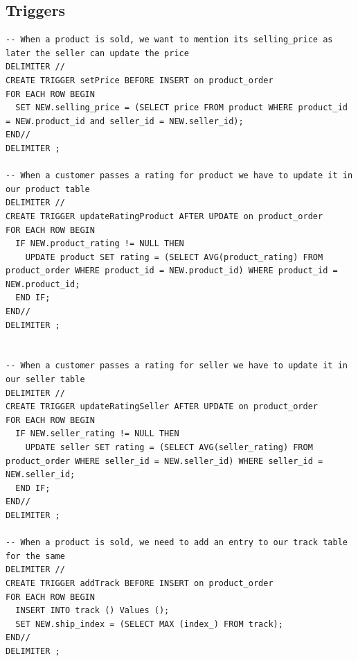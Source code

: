 \documentclass[a4paper,12pt]{article}
\begin{document}
\subsection{Triggers}
\begin{verbatim}
-- When a product is sold, we want to mention its selling_price as later the seller can update the price
DELIMITER //
CREATE TRIGGER setPrice BEFORE INSERT on product_order
FOR EACH ROW BEGIN
  SET NEW.selling_price = (SELECT price FROM product WHERE product_id = NEW.product_id and seller_id = NEW.seller_id);
END//
DELIMITER ;

-- When a customer passes a rating for product we have to update it in our product table
DELIMITER //
CREATE TRIGGER updateRatingProduct AFTER UPDATE on product_order
FOR EACH ROW BEGIN
  IF NEW.product_rating != NULL THEN
    UPDATE product SET rating = (SELECT AVG(product_rating) FROM product_order WHERE product_id = NEW.product_id) WHERE product_id = NEW.product_id;
  END IF;
END//
DELIMITER ;


-- When a customer passes a rating for seller we have to update it in our seller table
DELIMITER //
CREATE TRIGGER updateRatingSeller AFTER UPDATE on product_order
FOR EACH ROW BEGIN
  IF NEW.seller_rating != NULL THEN
    UPDATE seller SET rating = (SELECT AVG(seller_rating) FROM product_order WHERE seller_id = NEW.seller_id) WHERE seller_id = NEW.seller_id;
  END IF;
END//
DELIMITER ;

-- When a product is sold, we need to add an entry to our track table for the same
DELIMITER //
CREATE TRIGGER addTrack BEFORE INSERT on product_order
FOR EACH ROW BEGIN
  INSERT INTO track () Values ();
  SET NEW.ship_index = (SELECT MAX (index_) FROM track);
END//
DELIMITER ;
\end{verbatim}

\newpage
\end{document}
